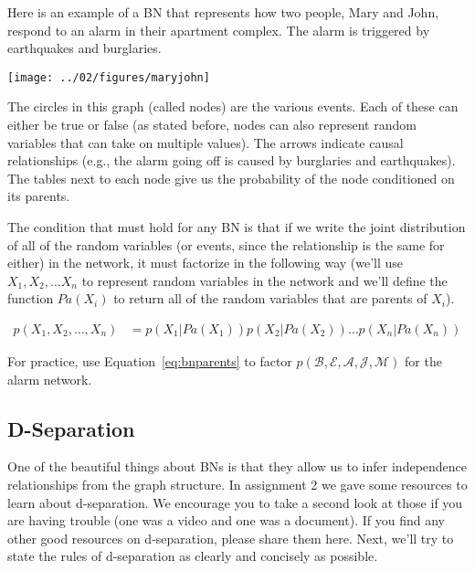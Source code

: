 \documentclass{tufte-handout}
\begin{document}
Here is an example of a BN that represents how two people, Mary and John, respond to an alarm in their apartment complex.  The alarm is triggered by earthquakes and burglaries.

\begin{center}
\texttt{[image: ../02/figures/maryjohn]}
\end{center}

The circles in this graph (called nodes) are the various events.  Each of these can either be true or false (as stated before, nodes can also represent random variables that can take on multiple values).  The arrows indicate causal relationships (e.g., the alarm going off is caused by burglaries and earthquakes).  The tables next to each node give us the probability of the node conditioned on its parents.

 The condition that must hold for any BN is that if we write the joint distribution of all of the random variables (or events, since the relationship is the same for either) in the network, it must factorize in the following way (we'll use $X_1, X_2, \ldots X_n$ to represent random variables in the network and we'll define the function $Pa(X_i)$ to return all of the random variables that are parents of $X_i$).

\begin{align}
p(X_1, X_2, \ldots, X_n) &= p(X_1 | Pa(X_1)) p(X_2 | Pa(X_2)) \ldots p(X_n | Pa(X_n)) \label{eq:bnparents}
\end{align}

\begin{exercise}
For practice, use Equation~\ref{eq:bnparents} to factor $p(\mathcal{B}, \mathcal{E}, \mathcal{A}, \mathcal{J}, \mathcal{M})$ for the alarm network.
\end{exercise}

\subsection{D-Separation}
One of the beautiful things about BNs is that they allow us to infer independence relationships from the graph structure.  In assignment 2 we gave some resources to learn about d-separation.  We encourage you to take a second look at those if you are having trouble (one was a video and one was a document).  If you find any other good resources on d-separation, please share them here.  Next, we'll try to state the rules of d-separation as clearly and concisely as possible.
\end{document}

